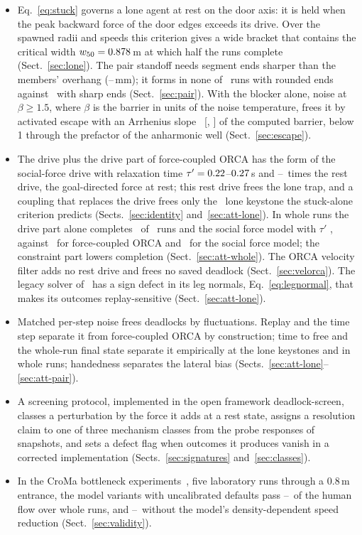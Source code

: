 \begin{itemize}
\item Eq.~\eqref{eq:stuck} governs a lone agent at rest on the door axis: it is held when the peak backward force of the door edges exceeds its drive. Over the spawned radii and speeds this criterion gives a wide bracket that contains the critical width $w_{50}=0.878$\,m at which half the runs complete (Sect.~\ref{sec:lone}). The pair standoff needs segment ends sharper than the members' overhang (\RevBfiveOverhangMin--\RevBfiveOverhangMax\,mm); it forms in none of \RevBfiveGenN\ runs with rounded ends against \RevBfiveGenPairRef\ with sharp ends (Sect.~\ref{sec:pair}). With the blocker alone, noise at $\beta\ge1.5$, where $\beta$ is the barrier in units of the noise temperature, frees it by activated escape with an Arrhenius slope \RzTtwoRatio\ [\RzTtwoLo, \RzTtwoHi] of the computed barrier, below 1 through the prefactor of the anharmonic well (Sect.~\ref{sec:escape}).
\item The drive plus the drive part of force-coupled ORCA has the form of the social-force drive with relaxation time $\tau'=0.22$--$0.27$\,s and \RevAoneDriveRatioLo--\RevAoneDriveRatioHi\ times the rest drive, the goal-directed force at rest; this rest drive frees the lone trap, and a coupling that replaces the drive frees only the \RzTonezeroLoneFreed\ lone keystone the stuck-alone criterion predicts (Sects.~\ref{sec:identity} and~\ref{sec:att-lone}). In whole runs the drive part alone completes \RwOneDriveK\ of \RwOneN\ runs and the social force model with $\tau'$ \RwOneTauK, against \RwOneOrcaK\ for force-coupled ORCA and \RwOneSfmK\ for the social force model; the constraint part lowers completion (Sect.~\ref{sec:att-whole}). The ORCA velocity filter adds no rest drive and frees no saved deadlock (Sect.~\ref{sec:velorca}). The legacy solver of~\cite{gang2026} has a sign defect in its leg normals, Eq.~\eqref{eq:legnormal}, that makes its outcomes replay-sensitive (Sect.~\ref{sec:att-lone}).
\item Matched per-step noise frees deadlocks by fluctuations. Replay and the time step separate it from force-coupled ORCA by construction; time to free and the whole-run final state separate it empirically at the lone keystones and in whole runs; handedness separates the lateral bias (Sects.~\ref{sec:att-lone}--\ref{sec:att-pair}).
\item A screening protocol, implemented in the open framework deadlock-screen, classes a perturbation by the force it adds at a rest state, assigns a resolution claim to one of three mechanism classes from the probe responses of snapshots, and sets a defect flag when outcomes it produces vanish in a corrected implementation (Sects.~\ref{sec:signatures} and~\ref{sec:classes}).
\item In the CroMa bottleneck experiments~\cite{fzj_ped20219,boomers2023data}, five laboratory runs through a 0.8\,m entrance, the model variants with uncalibrated defaults pass \RevDThreeRatioMin--\RevDThreeRatioMax\ of the human flow over whole runs, and \RvBoneCroOffMin--\RvBoneCroOffMax\ without the model's density-dependent speed reduction (Sect.~\ref{sec:validity}).
\end{itemize}
